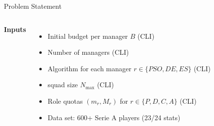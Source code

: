 \documentclass[aspectratio=169]{beamer}
\begin{document}
\begin{frame}{Problem Statement}
\begin{columns}[T,onlytextwidth]
			\textbf{Inputs}
			\begin{itemize}
				\item Initial budget per manager $B$  (CLI)
				\item Number of managers (CLI)
				\item Algorithm for each manager $r \in \{PSO, DE, ES\}$ (CLI)
				\item  squad size $N_{\max}$ (CLI)
				\item Role quotas $(m_r, M_r)$ for $r \in \{P, D, C, A\}$ (CLI)
				\item Data set: 600+ Serie A players (23/24 stats)
			\end{itemize}
			
			
		\end{columns}
	\end{frame}
\end{document}
